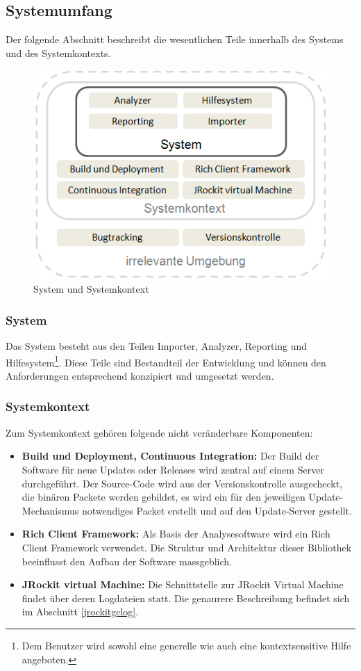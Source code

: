 \subsection{Systemumfang}
Der folgende Abschnitt beschreibt die wesentlichen Teile innerhalb des Systems und des Systemkontexts. 
 \begin{figure}[H]
  	\centering
    	\includegraphics{images/systemumfang}
        	\caption{System und Systemkontext}
\end{figure}
\subsubsection{System}
Das System besteht aus den Teilen Importer, Analyzer, Reporting und Hilfesystem\footnote{Dem Benutzer wird sowohl eine generelle wie auch eine kontextsensitive Hilfe angeboten.}. Diese Teile sind Bestandteil der Entwicklung und können den Anforderungen entsprechend konzipiert und umgesetzt werden.

\subsubsection{Systemkontext}
Zum Systemkontext gehören folgende nicht veränderbare Komponenten:
\begin{itemize}
	\item \textbf{Build und Deployment, Continuous Integration:} Der Build der Software für neue Updates oder Releases wird zentral auf einem Server durchgeführt. Der Source-Code wird aus der Versionskontrolle ausgecheckt, die binären Packete werden gebildet, es wird ein für den jeweiligen Update-Mechanismus notwendiges Packet erstellt und auf den Update-Server gestellt.

	\item \textbf{Rich Client Framework:} Als Basis der Analysesoftware wird ein Rich Client Framework verwendet. Die Struktur und Architektur dieser Bibliothek beeinflusst den Aufbau der Software massgeblich.
	\item \textbf{JRockit virtual Machine:} Die Schnittstelle zur JRockit Virtual Machine findet über deren Logdateien statt. Die genaurere Beschreibung befindet sich im Abschnitt \ref{jrockitgclog}.
\end{itemize}

